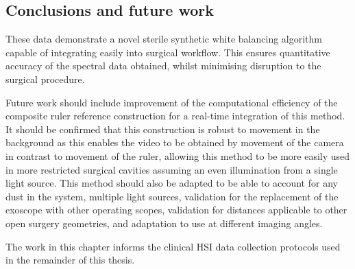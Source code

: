 \subsection{Conclusions and future work}
These data demonstrate a novel sterile synthetic white balancing algorithm capable of integrating easily into surgical workflow. This ensures quantitative accuracy of the spectral data obtained, whilst minimising disruption to the surgical procedure.

Future work should include improvement of the computational efficiency of the composite ruler reference construction for a real-time integration of this method. It should be confirmed that this construction is robust to movement in the background as this enables the video to be obtained by movement of the camera in contrast to movement of the ruler, allowing this method to be more easily used in more restricted surgical cavities assuming an even illumination from a single light source. This method should also be adapted to be able to account for any dust in the system, multiple light sources, validation for the replacement of the exoscope with other operating scopes, validation for distances applicable to other open surgery geometries, and adaptation to use at different imaging angles.

The work in this chapter informs the clinical HSI data collection protocols used in the remainder of this thesis. 



